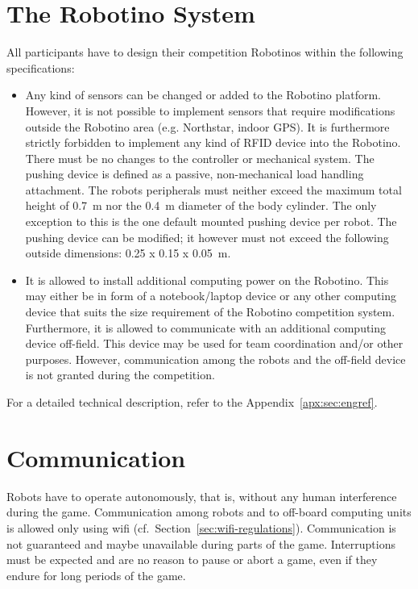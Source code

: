 \documentclass[12pt,twoside]{article}
\newcommand{\Robotino}{Robotino\textregistered}
\newcommand{\refsec}[1]{Section~\ref{#1}}
\begin{document}

\section{The Robotino System} \label{sec:robotino}

All participants have to design their competition Robotinos within
the following specifications:

\begin{itemize}
\item Any kind of sensors can be changed or added to the Robotino
  platform.  However, it is not possible to implement sensors that
  require modifications outside the Robotino area (e.g. Northstar,
  indoor GPS).  It is furthermore strictly forbidden to implement any
  kind of RFID device into the Robotino. There must be no changes to
  the controller or mechanical system. The pushing device is defined
  as a passive, non-mechanical load handling attachment. The robots
  peripherals must neither exceed the maximum total height of
  \SI{0.7}{\metre} nor the \SI{0.4}{\metre} diameter of the body
  cylinder. The only exception to this is the one default mounted
  pushing device per robot. The pushing device can be modified; it
  however must not exceed the following outside dimensions: \SI{0.25 x
    0.15 x 0.05}{\metre}.
\item It is allowed to install additional computing power on the
  \Robotino. This may either be in form of a notebook/laptop device or
  any other computing device that suits the size requirement of the
  \Robotino{} competition system. Furthermore, it is allowed to
  communicate with an additional computing device off-field. This
  device may be used for team coordination and/or other
  purposes. However, communication among the robots and the off-field
  device is not granted during the competition.
\end{itemize}

For a detailed technical description, refer to the
Appendix~\ref{apx:sec:engref}.

\section{Communication}
Robots have to operate autonomously, that is, without any human
interference during the game. Communication among robots and to
off-board computing units is allowed only using wifi
(cf.~\refsec{sec:wifi-regulations}). Communication is not guaranteed
and maybe unavailable during parts of the game. Interruptions must be
expected and are no reason to pause or abort a game, even if they
endure for long periods of the game.
\end{document}
